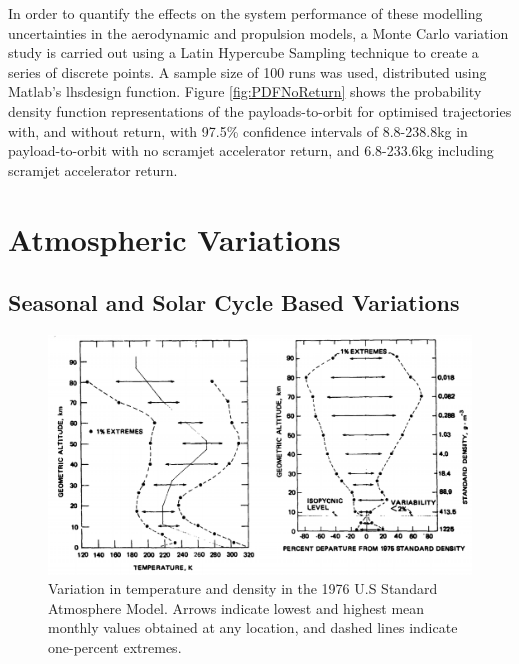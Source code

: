 In order to quantify the effects on the system performance of these modelling uncertainties in the aerodynamic and propulsion models, a Monte Carlo variation study is carried out using a Latin Hypercube Sampling technique to create a series of discrete points. A sample size of 100 runs was used, distributed using Matlab's \textsf{lhsdesign} function. Figure \ref{fig:PDFNoReturn} shows the probability density function representations of the payloads-to-orbit for optimised trajectories with, and without return, with 97.5\% confidence intervals of 8.8-238.8kg in payload-to-orbit with no scramjet accelerator return, and 6.8-233.6kg including scramjet accelerator return. 



\section{Atmospheric Variations}\label{sec:atmosunc}
\subsection{Seasonal and Solar Cycle Based Variations}

\begin{figure}[ht]
	\centering
	\includegraphics[width=0.8\linewidth]{figures/A1_uncertainty-analysis/AtmosphericVariation}
	\caption{Variation in temperature and density in the 1976 U.S Standard Atmosphere Model\cite{Administration1976}. Arrows indicate lowest and highest mean monthly values obtained at any location, and dashed lines indicate one-percent extremes.}
	\label{fig:AtmosphericVariation}
\end{figure}

